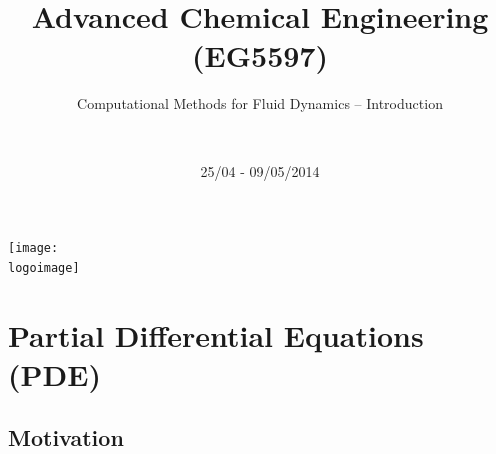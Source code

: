 \documentclass[10pt,compress]{beamer}
\institute{School of Engineering}
\title{Advanced Chemical Engineering (EG5597)}
\subtitle{Computational Methods for Fluid Dynamics -- Introduction}
\date[25/04 - 09/05/2014]{25/04 - 09/05/2014}
\author[\shortname]{%
  \fullname\\\ttfamily{\emailaddress}
}
\newcommand{\logoimage}{./FigBanner/UoAHorizBanner}
\begin{document}
\begin{frame}
  \titlepage
  \vfill%
  \begin{center}
    \texttt{[image: \\logoimage]}
  \end{center}
\end{frame}




\section{Partial Differential Equations (PDE)} 

\subsection{Motivation}
\end{document}
